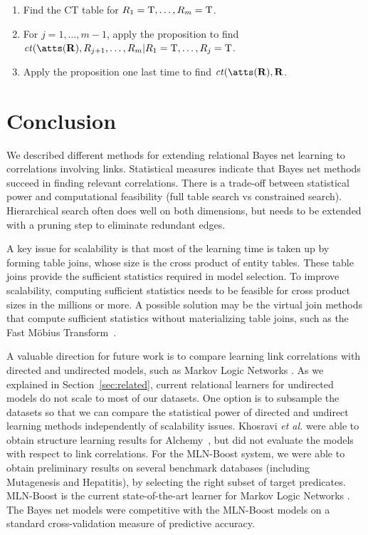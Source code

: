 \documentclass{article}
\newcommand{\ct}{\mathit{ct}}
\begin{document}

\begin{enumerate}
\item Find the CT table for $R_{1}=\mathrm{T},\ldots,R_{m}=\mathrm{T}$.
\item For $j=1,\ldots,m-1$, apply the proposition to find $\ct(\atts(\set{R}),R_{j+1},\ldots,R_{m}|R_{1} = \true,\ldots,R_{j} = \true$.
\item Apply the proposition one last time to find $\ct(\atts(\set{R}),\set{R}$.
\end{enumerate}



\section{Conclusion} We described different methods for extending relational Bayes net learning to correlations involving links. 
Statistical measures indicate that Bayes net methods succeed in finding relevant correlations. 
There is a trade-off between statistical power and computational feasibility (full table search vs constrained search). 
Hierarchical search often does well on both dimensions, but needs to be extended with a pruning step to eliminate redundant edges.

A key issue for scalability is that most of the learning time is taken up by forming table joins, whose size is the cross product of entity tables. 
These table joins provide the sufficient statistics required in model selection. 
To improve scalability, computing sufficient statistics needs to be feasible for cross product sizes in the millions or more. 
A possible solution may be the virtual join methods that compute sufficient statistics without materializing table joins, such as the Fast M\"obius Transform~\cite{Schulte2012b,Yin2004}.

A valuable direction for future work is to compare learning link correlations with directed and undirected models, such as Markov Logic Networks \cite{Domingos2009}. As we explained in Section~\ref{sec:related}, current relational learners for undirected models do not scale to most of our datasets. One option is to subsample the datasets so that we can compare the statistical power of directed and undirect learning methods
independently of scalability issues. Khosravi {\em et al.} were able to obtain structure learning results for Alchemy~\cite{Khosravi2010}, but did not evaluate the models with respect to link correlations. For the MLN-Boost system, we were able to obtain preliminary results on several benchmark databases  (including Mutagenesis and Hepatitis), by selecting the right subset of target predicates. MLN-Boost is the current state-of-the-art learner for Markov Logic Networks \cite{Khot2011}. The Bayes net models were competitive with the MLN-Boost models on a standard cross-validation measure of predictive accuracy.



\end{document}
